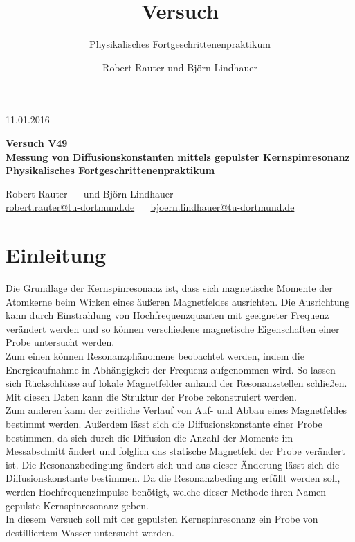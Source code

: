 \documentclass[]{scrartcl}
\title{Versuch \versuchnummer\\ \versuchname}
\subtitle{Physikalisches Fortgeschrittenenpraktikum}
\author{Robert Rauter und Björn Lindhauer}
\date{\versuchdatum}
\newcommand{\versuchnummer}{V49}
\newcommand{\versuchname}{Messung von Diffusionskonstanten mittels gepulster Kernspinresonanz}
\newcommand{\versuchdatum}{11.01.2016}
\begin{document}
\begin{titlepage}
{\large \versuchdatum}
\vspace{7cm}
\begin{center}
\textbf{\huge Versuch \versuchnummer}\\
\vspace{0.5cm}
\textbf{\huge \versuchname}\\
\vspace{0.2cm}
\textbf{ Physikalisches Fortgeschrittenenpraktikum}\\
\vspace{9cm}

{\Large Robert Rauter \ \ \hspace{1.5cm} und \hspace{1.5cm} Björn Lindhauer}\\
{ \url{robert.rauter@tu-dortmund.de} \ \ \hspace{2cm} \url{bjoern.lindhauer@tu-dortmund.de}}
\end{center}
\end{titlepage}
\section{Einleitung}
Die Grundlage der Kernspinresonanz ist, dass sich magnetische Momente der Atomkerne beim Wirken eines äußeren Magnetfeldes ausrichten. Die Ausrichtung kann durch Einstrahlung von Hochfrequenzquanten mit geeigneter Frequenz verändert werden und so können verschiedene magnetische Eigenschaften einer Probe untersucht werden.\\
Zum einen können Resonanzphänomene beobachtet werden, indem die Energieaufnahme in Abhängigkeit der Frequenz aufgenommen wird. So lassen sich Rückschlüsse auf lokale Magnetfelder anhand der Resonanzstellen schließen. Mit diesen Daten kann die Struktur der Probe rekonstruiert werden.\\
Zum anderen kann der zeitliche Verlauf von Auf- und Abbau eines Magnetfeldes bestimmt werden. Außerdem lässt sich die Diffusionskonstante einer Probe bestimmen, da sich durch die Diffusion die Anzahl der Momente im Messabschnitt ändert und folglich das statische Magnetfeld der Probe verändert ist. Die Resonanzbedingung ändert sich und aus dieser Änderung lässt sich die Diffusionskonstante bestimmen. Da die Resonanzbedingung erfüllt werden soll, werden Hochfrequenzimpulse benötigt, welche dieser Methode ihren Namen gepulste Kernspinresonanz geben.\\
In diesem Versuch soll mit der gepulsten Kernspinresonanz ein Probe von destilliertem Wasser untersucht werden.
\end{document}
